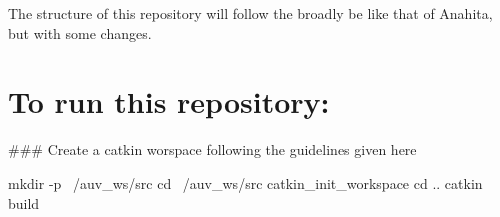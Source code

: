 \href{https://travis-ci.org/AUV-IITK/triton}{\tt }

The structure of this repository will follow the broadly be like that of Anahita, but with some changes.\hypertarget{autotoc_md72_autotoc_md73}{}\section{To run this repository\+:}\label{autotoc_md72_autotoc_md73}
\#\#\# Create a catkin worspace following the guidelines given here 
\begin{DoxyCode}
mkdir -p ~/auv\_ws/src
cd ~/auv\_ws/src
catkin\_init\_workspace
cd ..
catkin build
\end{DoxyCode}
